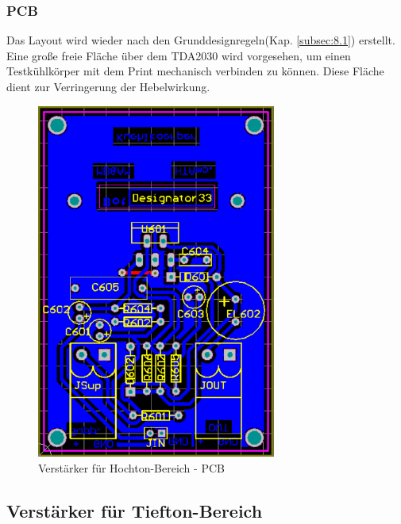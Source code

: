 \newpage
\subsubsection{PCB}\label{subsec:5.1.3}
Das Layout wird wieder nach den Grunddesignregeln(Kap. \ref{subsec:8.1}) erstellt.\\
Eine große freie Fläche über dem TDA2030 wird vorgesehen, um einen Testkühlkörper mit dem Print mechanisch verbinden zu können.
Diese Fläche dient zur Verringerung der Hebelwirkung.

\begin{figure} [H]
	\centering	
	\includegraphics[width=0.7\textwidth]{img/Print6/HTVerstaerker-PCB.PNG}
	\caption{Verstärker für Hochton-Bereich - PCB}
	\label {fig:5.1.3.1}
\end{figure}


\newpage
\subsection{Verstärker für Tiefton-Bereich}
